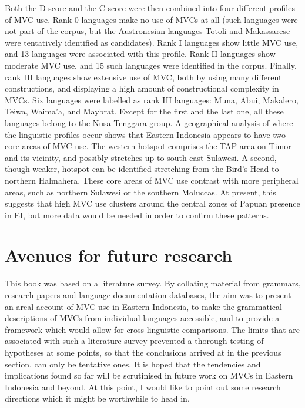 Both the D-score and the C-score were then combined into four different profiles of MVC use. Rank 0 languages make no use of MVCs at all (such languages were not part of the corpus, but the Austronesian languages Totoli and Makassarese were tentatively identified as candidates). Rank I languages show little MVC use, and 13 languages were associated with this profile. Rank II languages show moderate MVC use, and 15 such languages were identified in the corpus. Finally, rank III languages show extensive use of MVC, both by using many different constructions, and displaying a high amount of constructional complexity in MVCs. Six languages were labelled as rank III languages: Muna, Abui, Makalero, Teiwa, Waima'a, and Maybrat. Except for the first and the last one, all these languages belong to the Nusa Tenggara group. A geographical analysis of where the linguistic profiles occur shows that Eastern Indonesia appears to have two core areas of MVC use. The western hotspot comprises the TAP area on Timor and its vicinity, and possibly stretches up to south-east Sulawesi. A second, though weaker, hotspot can be identified stretching from the Bird's Head to northern Halmahera. These core areas of MVC use contrast with more peripheral areas, such as northern Sulawesi or the southern Moluccas. At present, this suggests that high MVC use clusters around the central zones of Papuan presence in EI, but more data would be needed in order to confirm these patterns.

\section{Avenues for future research}

This book was based on a literature survey. By collating material from grammars, research papers and language documentation databases, the aim was to present an areal account of MVC use in Eastern Indonesia, to make the grammatical descriptions of MVCs from individual languages accessible, and to provide a framework which would allow for cross-linguistic comparisons. The limits that are associated with such a literature survey prevented a thorough testing of hypotheses at some points, so that the conclusions arrived at in the previous section, can only be tentative ones. It is hoped that the tendencies and implications found so far will be scrutinised in future work on MVCs in Eastern Indonesia and beyond. At this point, I would like to point out some research directions which it might be worthwhile to head in.

